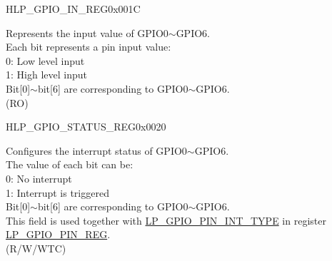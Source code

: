 \begin{register}{H}{LP\_GPIO\_IN\_REG}{0x001C}\label{regdesc:LPGPIOINREG}
%
%
\regnewline%
\begin{regdesc}\begin{reglist}
\label{fielddesc:LPGPIOINDATANEXT}\item [LP\_GPIO\_IN\_DATA\_NEXT] Represents the input value of GPIO0$\sim$GPIO6.\\
Each bit represents a pin input value:\\
0: Low level input\\
1: High level input\\
Bit[0]$\sim$bit[6] are corresponding to GPIO0$\sim$GPIO6.\\ (RO)
\end{reglist}\end{regdesc}
\end{register}


\begin{register}{H}{LP\_GPIO\_STATUS\_REG}{0x0020}\label{regdesc:LPGPIOSTATUSREG}
%
%
\regnewline%
\begin{regdesc}\begin{reglist}
\label{fielddesc:LPGPIOSTATUSINTERRUPT}\item [LP\_GPIO\_STATUS\_INTERRUPT] Configures the interrupt status of GPIO0$\sim$GPIO6.\\
The value of each bit can be:\\
0: No interrupt\\
1: Interrupt is triggered\\
Bit[0]$\sim$bit[6] are corresponding to GPIO0$\sim$GPIO6.\\
This field is used together with \hyperref[fielddesc:LPGPIOPINNINTTYPE]{LP\_GPIO\_PIN\_INT\_TYPE} in register \hyperref[regdesc:LPGPIOPINNREG]{LP\_GPIO\_PIN\_REG}.\\
 (R/W/WTC)
\end{reglist}\end{regdesc}
\end{register}


